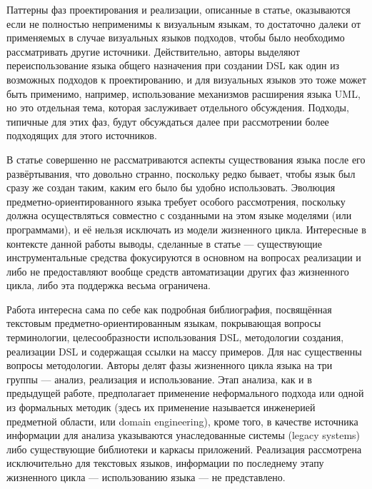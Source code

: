 Паттерны фаз проектирования и реализации, описанные в статье, оказываются если не полностью 
неприменимы к визуальным языкам, то достаточно далеки от применяемых в случае визуальных 
языков подходов, чтобы было необходимо рассматривать другие источники. Действительно, 
авторы выделяют переиспользование языка общего назначения при создании DSL как один 
из возможных подходов к проектированию, и для визуальных языков это тоже может быть 
применимо, например, использование механизмов расширения языка UML, но это отдельная 
тема, которая заслуживает отдельного обсуждения. Подходы, типичные для этих фаз, будут 
обсуждаться далее при рассмотрении более подходящих для этого источников.

В статье совершенно не рассматриваются аспекты существования языка после его развёртывания, 
что довольно странно, поскольку редко бывает, чтобы язык был сразу же создан таким, 
каким его было бы удобно использовать. Эволюция предметно-ориентированного языка требует 
особого рассмотрения, поскольку должна осуществляться совместно с созданными на этом языке 
моделями (или программами), и её нельзя исключать из модели жизненного цикла. Интересные 
в контексте данной работы выводы, сделанные в статье --- существующие инструментальные средства 
фокусируются в основном на вопросах реализации и либо не предоставляют вообще средств 
автоматизации других фаз жизненного цикла, либо эта поддержка весьма ограничена. 

Работа \cite{van2000domain} интересна сама по себе как подробная библиография, посвящённая 
текстовым предметно-ориентированным языкам, покрывающая вопросы терминологии, целесообразности 
использования DSL, методологии создания, реализации DSL и содержащая ссылки на массу 
примеров. Для нас существенны вопросы методологии. Авторы делят фазы жизненного цикла языка 
на три группы --- анализ, реализация и использование. Этап анализа, как и в предыдущей работе, 
предполагает применение неформального подхода или одной из формальных методик (здесь их 
применение называется инженерией предметной области, или domain engineering), кроме 
того, в качестве источника информации для анализа указываются унаследованные системы 
(legacy systems) либо существующие библиотеки и каркасы приложений. Реализация 
рассмотрена исключительно для текстовых языков, информации по последнему этапу жизненного 
цикла --- использованию языка --- не представлено.

